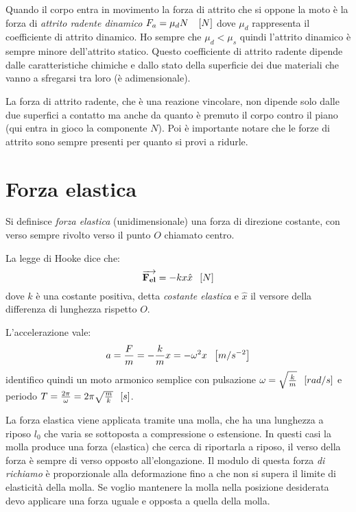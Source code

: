 \documentclass[class=book, crop=false, oneside, 12pt]{standalone}
\begin{document}
Quando il corpo entra in movimento la forza di attrito che si oppone la moto è la forza di \emph{attrito radente dinamico} \(F_a = \mu_d N \ \hspace{0.2cm} \left[N\right]\) dove \(\mu_d\) rappresenta il coefficiente di attrito dinamico.
Ho sempre che \(\mu_d < \mu_s\) quindi l'attrito dinamico è sempre minore dell'attrito statico.
Questo coefficiente di attrito radente dipende dalle caratteristiche chimiche e dallo stato della superficie dei due materiali che vanno a sfregarsi tra loro (è adimensionale).

La forza di attrito radente, che è una reazione vincolare, non dipende solo dalle due superfici a contatto ma anche da quanto è premuto il corpo contro il piano (qui entra in gioco la componente \(N\)).
Poi è importante notare che le forze di attrito sono sempre presenti per quanto si provi a ridurle.

\section{Forza elastica}

Si definisce \emph{forza elastica} (unidimensionale) una forza di direzione costante, con verso sempre rivolto verso il punto \(O\) chiamato centro.

La legge di Hooke dice che:
\begin{equation}
    \overrightarrow{\mathbf{F_{el}}} = -k x \hat{x} \udm{N}
\end{equation}
dove \(k\) è una costante positiva, detta \emph{costante elastica} e \(\hat{x}\) il versore della differenza di lunghezza rispetto \(O\).

L'accelerazione vale:
\begin{equation}
    a = \frac{F}{m} = -\frac{k}{m}x = -\omega^2 x \hspace{0.2cm} \left[m/s^{-2}\right]
\end{equation}
identifico quindi un moto armonico semplice con pulsazione \(\omega = \sqrt{\frac{k}{m}} \hspace{0.2cm} \left[rad/s\right]\)  e periodo \(T = \frac{2 \pi}{\omega} = 2 \pi \sqrt{\frac{m}{k}} \hspace{0.2cm} \left[s\right]\).

La forza elastica viene applicata tramite una molla, che ha una lunghezza a riposo \(l_0\) che varia se sottoposta a compressione o estensione. 
In questi casi la molla produce una forza (elastica) che cerca di riportarla a riposo, il verso della forza è sempre di verso opposto all'elongazione. 
Il modulo di questa forza \emph{di richiamo} è proporzionale alla deformazione fino a che non si supera il limite di elasticità della molla.
Se voglio mantenere la molla nella posizione desiderata devo applicare una forza uguale e opposta a quella della molla.
\end{document}

